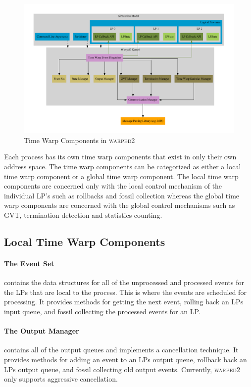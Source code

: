 \documentclass[11pt]{book}
\begin{document}
\begin{figure}[H]
    \centering
    \includegraphics[width=\textwidth]{figs/graphviz/warped2_overview.pdf}
    \caption{Time Warp Components in \textsc{warped2}}\label{warped2_architecture}
\end{figure}

\noindent
Each process has its own time warp components that exist in only their own address space.
The time warp components can be categorized as either a local time warp component or a global
time warp component. The local time warp components are concerned only with the local control
mechanism of the individual LP's such as rollbacks and fossil collection whereas the global
time warp components are concerned with the global control mechanisms such as GVT, termination
detection and statistics counting.

\subsection{Local Time Warp Components}

\paragraph{The Event Set} contains the data structures for all of the unprocessed and
processed events for the LPs that are local to the process. This is where the events are
scheduled for processing. It provides methods for getting the next event, rolling back an
LPs input queue, and fossil collecting the processed events for an LP.

\paragraph{The Output Manager} contains all of the output queues and implements a cancellation
technique. It provides methods for adding an event to an LPs output queue, rollback back an
LPs output queue, and fossil collecting old output events. Currently, \textsc{warped2} only
supports aggressive cancellation.
\end{document}
